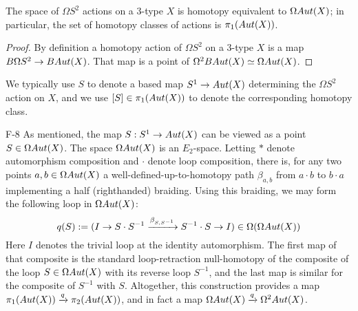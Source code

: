 \documentclass{amsart}
\begin{document}
\begin{proposition}
The space of $\Omega S^2$ actions on a 3-type $X$ is homotopy equivalent to $\Omega Aut(X)$; in particular, the set of homotopy classes of actions is $\pi_1(Aut(X))$.
\end{proposition}

\begin{proof}
By definition a homotopy action of $\Omega S^2$ on a 3-type $X$ is a map $B \Omega S^2 \rightarrow BAut(X)$.  That map is a point of $\Omega^2 BAut(X) \simeq \Omega Aut(X)$.
\end{proof}

\nid We typically use $S$ to denote a based map $S^1 \rightarrow Aut(X)$ determining the $\Omega S^2$ action on $X$, and we use $[S] \in \pi_1(Aut(X))$ to denote the corresponding homotopy class.


\begin{tconstr}{F-8}
\label{fig8}
As mentioned, the map $S : S^1 \rightarrow Aut(X)$ can be viewed as a point $S \in \Omega Aut(X)$.  The space $\Omega Aut(X)$ is an $E_2$-space.  Letting $\ast$ denote automorphism composition and $\cdot$ denote loop composition, there is, for any two points $a, b \in \Omega Aut(X)$ a well-defined-up-to-homotopy path $\beta_{a,b}$ from $a \cdot b$ to $b \cdot a$ implementing a half (righthanded) braiding.  Using this braiding, we may form the following loop in $\Omega Aut(X)$:
\[
q(S) := (I \rightarrow S \cdot S^{-1} \xrightarrow{\beta_{S,S^{-1}}} S^{-1} \cdot S \rightarrow I) \in \Omega (\Omega Aut(X))
\]
Here $I$ denotes the trivial loop at the identity automorphism.  The first map of that composite is the standard loop-retraction null-homotopy of the composite of the loop $S \in \Omega Aut(X)$ with its reverse loop $S^{-1}$, and the last map is similar for the composite of $S^{-1}$ with $S$.  Altogether, this construction provides a map $\pi_1(Aut(X)) \xrightarrow{q} \pi_2(Aut(X))$, and in fact a map $\Omega Aut(X) \xrightarrow{q} \Omega^2 Aut(X)$.
\end{tconstr}
\end{document}
